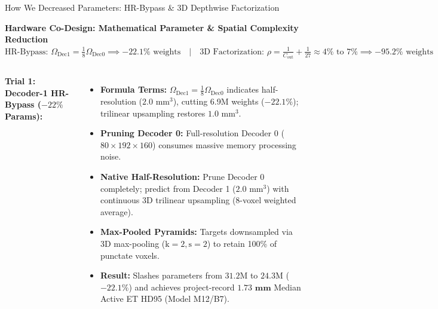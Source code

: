 \documentclass[aspectratio=169, 10pt]{beamer}
\begin{document}
\begin{frame}{How We Decreased Parameters: HR-Bypass \& 3D Depthwise Factorization}
  \begin{block}{\small \textbf{Hardware Co-Design: Mathematical Parameter \& Spatial Complexity Reduction}}
    \centering
    $\text{HR-Bypass: } \Omega_{\text{Dec1}} = \frac{1}{8}\Omega_{\text{Dec0}} \implies -22.1\% \text{ weights} \quad \Big| \quad \text{3D Factorization: } \rho = \frac{1}{C_{\text{out}}} + \frac{1}{27} \approx 4\% \text{ to } 7\% \implies -95.2\% \text{ weights}$
    
    \vspace{2pt}
  \end{block}
  
  \vspace{0.15cm}
  \begin{columns}[T]
    \textbf{Trial 1: Decoder-1 HR-Bypass ($-22\%$ Params):}
    \begin{itemize}\itemsep=3pt
      \scriptsize
      \item \textbf{Formula Terms:} $\Omega_{\text{Dec1}} = \frac{1}{8}\Omega_{\text{Dec0}}$ indicates half-resolution ($2.0\text{ mm}^3$), cutting 6.9M weights ($-22.1\%$); trilinear upsampling restores $1.0\text{ mm}^3$.
      \item \textbf{Pruning Decoder 0:} Full-resolution Decoder 0 ($80\times 192\times 160$) consumes massive memory processing noise.
      \item \textbf{Native Half-Resolution:} Prune Decoder 0 completely; predict from Decoder 1 ($2.0\text{ mm}^3$) with continuous 3D trilinear upsampling (8-voxel weighted average).
      \item \textbf{Max-Pooled Pyramids:} Targets downsampled via 3D max-pooling ($\text{k}=2, \text{s}=2$) to retain 100\% of punctate voxels.
      \item \textbf{Result:} Slashes parameters from $31.2\text{M}$ to $24.3\text{M}$ ($-22.1\%$) and achieves project-record $\mathbf{1.73\text{ mm}}$ Median Active ET HD95 (Model M12/B7).
    \end{itemize}
    

\end{columns}
\end{frame}
\end{document}
